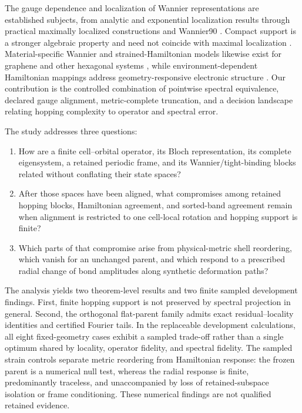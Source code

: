 \documentclass[11pt]{article}
\begin{document}
The gauge dependence and localization of Wannier representations are established
subjects, from analytic and exponential localization results
\cite{Kohn1959AnalyticWannier,Brouder2007ExponentialWannier} through practical
maximally localized constructions and Wannier90
\cite{Mostofi2008Wannier90,Marzari2012MaximallyLocalized}. Compact support is a
stronger algebraic property and need not coincide with maximal localization
\cite{Sathe2024CompactWannier}. Material-specific Wannier and strained-Hamiltonian
models likewise exist for graphene and other hexagonal systems
\cite{Jung2013GrapheneWannier,Fang2018Strained2D}, while environment-dependent
Hamiltonian mappings address geometry-responsive electronic structure
\cite{Zhang2022EquivariantHamiltonians}. Our contribution is the controlled combination
of pointwise spectral equivalence, declared gauge alignment, metric-complete truncation,
and a decision landscape relating hopping complexity to operator and spectral error.

The study addresses three questions:
\begin{enumerate}
 \item How are a finite cell--orbital operator, its Bloch representation, its complete
       eigensystem, a retained periodic frame, and its Wannier/tight-binding blocks
       related without conflating their state spaces?
 \item After those spaces have been aligned, what compromises among retained hopping
       blocks, Hamiltonian agreement, and sorted-band agreement remain when alignment is
       restricted to one cell-local rotation and hopping support is finite?
 \item Which parts of that compromise arise from physical-metric shell reordering,
       which vanish for an unchanged parent, and which respond to a prescribed radial
       change of bond amplitudes along synthetic deformation paths?
\end{enumerate}

The analysis yields two theorem-level results and two finite sampled development
findings. First, finite hopping support is not preserved by spectral projection in
general. Second, the orthogonal flat-parent family admits exact residual--locality
identities and certified Fourier tails. In the replaceable development calculations,
all eight fixed-geometry cases exhibit a sampled trade-off rather than a single optimum
shared by locality, operator fidelity, and spectral fidelity. The sampled strain
controls separate metric reordering from Hamiltonian response: the frozen parent is a
numerical null test, whereas the radial response is finite, predominantly traceless, and
unaccompanied by loss of retained-subspace isolation or frame conditioning. These
numerical findings are not qualified retained evidence.
\end{document}
